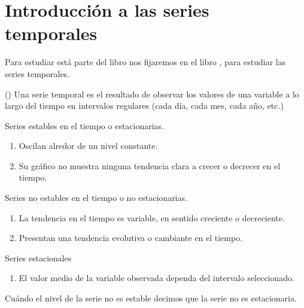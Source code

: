 \chapter{Introducci\'on a las series temporales}
Para estudiar est\'a parte del libro nos fijaremos en el libro \cite{Pena2010}, para estudiar las series temporales.
\begin{definition} {\rm (\cite{Pena2010}) }
Una serie temporal es el resultado de observar los valores de una variable a lo largo del tiempo 
en intervalos regulares (cada d\'ia, cada mes, cada a\~no, etc.)
\end{definition}

Series estables en el tiempo o estacionarias.
\begin{enumerate}
    \item Oscilan alredor de un nivel constante.
    \item Su gr\'afico no muestra ninguna tendencia clara a crecer o decrecer en el tiempo.
\end{enumerate}

Series no estables en el tiempo o no estacionarias.
\begin{enumerate}
    \item La tendencia en el tiempo es variable, en sentido creciente o decreciente.
    \item Presentan una tendencia evolutiva o cambiante en el tiempo.
\end{enumerate}

Series estacionales
\begin{enumerate}
    \item El valor medio de la variable observada dependa del intervalo seleccionado.
\end{enumerate}

Cu\'ando el nivel de la serie no es estable decimos que la serie no es estacionaria.

